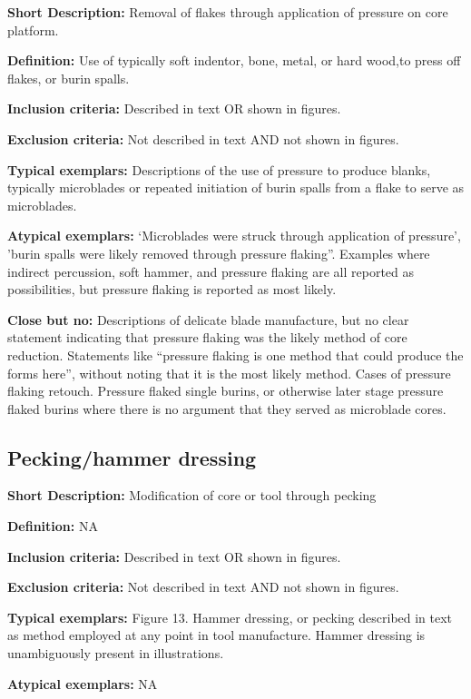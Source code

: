 \documentclass[
]{article}
\begin{document}
\textbf{Short Description:} Removal of flakes through application of
pressure on core platform.

\textbf{Definition:} Use of typically soft indentor, bone, metal, or
hard wood,to press off flakes, or burin spalls.

\textbf{Inclusion criteria:} Described in text OR shown in figures.

\textbf{Exclusion criteria:} Not described in text AND not shown in
figures.

\textbf{Typical exemplars:} Descriptions of the use of pressure to
produce blanks, typically microblades or repeated initiation of burin
spalls from a flake to serve as microblades.

\textbf{Atypical exemplars:} `Microblades were struck through
application of pressure', 'burin spalls were likely removed through
pressure flaking''. Examples where indirect percussion, soft hammer, and
pressure flaking are all reported as possibilities, but pressure flaking
is reported as most likely.

\textbf{Close but no:} Descriptions of delicate blade manufacture, but
no clear statement indicating that pressure flaking was the likely
method of core reduction. Statements like ``pressure flaking is one
method that could produce the forms here'', without noting that it is
the most likely method. Cases of pressure flaking retouch. Pressure
flaked single burins, or otherwise later stage pressure flaked burins
where there is no argument that they served as microblade cores.

\hypertarget{peckinghammer-dressing}{%
\subsection{Pecking/hammer dressing}\label{peckinghammer-dressing}}

\textbf{Short Description:} Modification of core or tool through pecking

\textbf{Definition:} NA

\textbf{Inclusion criteria:} Described in text OR shown in figures.

\textbf{Exclusion criteria:} Not described in text AND not shown in
figures.

\textbf{Typical exemplars:} Figure 13. Hammer dressing, or pecking
described in text as method employed at any point in tool manufacture.
Hammer dressing is unambiguously present in illustrations.

\textbf{Atypical exemplars:} NA
\end{document}
